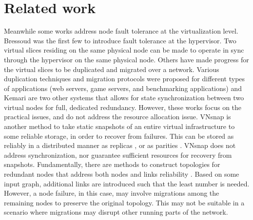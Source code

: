 \section{Related work}



Meanwhile some works address node fault tolerance at the virtualization level. Bressoud \cite{bressoud1996hypervisor} was the first few to introduce fault tolerance at the hypervisor. Two virtual slices residing on the same physical node can be made to operate in sync through the hypervisor on the same physical node. Others \cite{wang2008virtual,cully2008remus} have made progress for the virtual slices to be duplicated and migrated over a network. Various duplication techniques and migration protocols were proposed for different types of applications (web servers, game servers, and benchmarking applications) \cite{wang2008virtual,cully2008remus} and Kemari \cite{tamura2008kemari} are two other systems that allows for state synchronization between two virtual nodes for full, dedicated
redundancy. However, these works focus on the practical issues, and do not address the resource allocation issue. VNsnap \cite{kangarlou2009vnsnap} is another method to take static snapshots of an entire virtual infrastructure to some reliable storage, in order to recover from failures. This can be stored as reliably
in a distributed manner as replicas \cite{chang2008bigtable}, or as parities \cite{dimakis2006decentralized,yeow2011highly}. VNsnap does not address synchronization, nor guarantee sufficient resources for recovery from snapshots. Fundamentally, there are methods to construct topologies for redundant nodes that address both nodes and links reliability \cite{ajtai1992fault,dutt1997node}. Based on some input graph, additional links are introduced such that the least number is needed. However, a node failure, in this case, may involve migrations among the remaining nodes to preserve the original topology. This may not be suitable in a scenario where migrations
may disrupt other running parts of the network.


